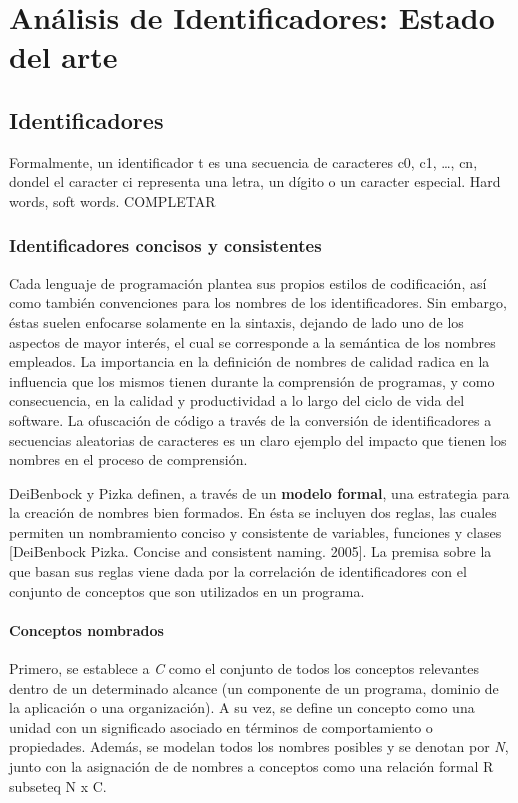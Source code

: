 \chapter{Análisis de Identificadores: Estado del arte}

\section{Identificadores}
Formalmente, un identificador t es una secuencia de caracteres c0, c1, …, cn, dondel el caracter ci representa una letra, un dígito o un caracter especial. Hard words, soft words. COMPLETAR

\subsection{Identificadores concisos y consistentes}
Cada lenguaje de programación plantea sus propios estilos de codificación, así como también convenciones para los nombres de los identificadores. Sin embargo, éstas suelen enfocarse solamente en la sintaxis, dejando de lado uno de los aspectos de mayor interés, el cual se corresponde a la semántica de los nombres empleados. La importancia en la definición de nombres de calidad radica en la influencia que los mismos tienen durante la comprensión de programas, y como consecuencia, en la calidad y productividad a lo largo del ciclo de vida del software. La ofuscación de código a través de la conversión de identificadores a secuencias aleatorias de caracteres es un claro ejemplo del impacto que tienen los nombres en el proceso de comprensión.

DeiBenbock y Pizka definen, a través de un \textbf{modelo formal}, una estrategia para la creación de nombres bien formados. En ésta se incluyen dos reglas, las cuales permiten un nombramiento conciso y consistente de variables, funciones y clases [DeiBenbock Pizka. Concise and consistent naming. 2005]. La premisa sobre la que basan sus reglas viene dada por la correlación de identificadores con el conjunto de conceptos que son utilizados en un programa.

\subsubsection{Conceptos nombrados}
Primero, se establece a \textit{C} como el conjunto de todos los conceptos relevantes dentro de un determinado alcance (un componente de un programa, dominio de la aplicación o una organización). A su vez, se define un concepto como una unidad con un significado asociado en términos de comportamiento o propiedades. Además, se modelan todos los nombres posibles y se denotan por \textit{N}, junto con la asignación de de nombres a conceptos como una relación formal R \\subseteq N x C.

